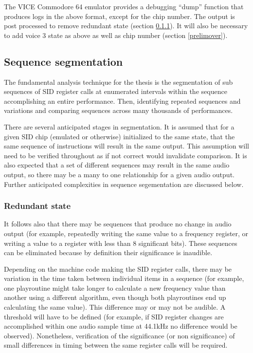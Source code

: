 \documentclass[10pt]{article}
\begin{document}
\begin{multicols*}{2}
The VICE Commodore 64 emulator\cite{asidvice} provides a debugging “dump” function that produces logs in the above format, except for the chip number. The output is post processed to remove redundant state (section \ref{redundantstate}). It will also be necessary to add voice 3 state as above as well as chip number (section \ref{prelimover}).

\subsection{Sequence segmentation}

The fundamental analysis technique for the thesis is the segmentation of sub sequences of SID register calls at enumerated intervals within the sequence accomplishing an entire performance. Then, identifying repeated sequences and variations and comparing sequences across many thousands of performances.

There are several anticipated stages in segmentation. It is assumed that for a given SID chip (emulated or otherwise) initialized to the same state, that the same sequence of instructions will result in the same output. This assumption will need to be verified throughout as if not correct would invalidate comparison. It is also expected that a set of different sequences may result in the same audio output, so there may be a many to one relationship for a given audio output. Further anticipated complexities in sequence segementation are discussed below.

\subsubsection{Redundant state}
\label{redundantstate}

It follows also that there may be sequences that produce no change in audio output (for example, repeatedly writing the same value to a frequency register, or writing a value to a register with less than 8 significant bits). These sequences can be eliminated because by definition their significance is inaudible.

Depending on the machine code making the SID register calls, there may be variation in the time taken between individual items in a sequence (for example, one playroutine might take longer to calculate a new frequency value than another using a different algorithm, even though both playroutines end up calculating the same value). This difference may or may not be audible. A threshold will have to be defined (for example, if SID register changes are accomplished within one audio sample time at 44.1kHz no difference would be observed). Nonetheless, verification of the significance (or non significance) of small differences in timing between the same register calls will be required.


\end{multicols*}
\end{document}
